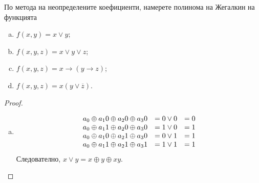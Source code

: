 \begin{problem}
  По метода на неопределените коефициенти, намерете полинома на Жегалкин на функцията 
  \begin{enumerate}[a)]
  \item
    $f(x,y) = x\vee y$;
  \item
    $f(x,y,z) = x\vee y \vee z$;
  \item
    $f(x,y,z) = x\rightarrow (y \rightarrow z)$;
  \item
    $f(x,y,z) = x(y\vee\overline{z})$.
  \end{enumerate}
\end{problem}
\begin{proof}
  \begin{enumerate}[a)]
  \item
    \[
    \begin{array}{c c c}
      a_0\oplus a_1 0 \oplus a_2 0 \oplus a_3 0 & = 0 \vee 0  &  = 0\\
      a_0\oplus a_1 1 \oplus a_2 0 \oplus a_3 0 & = 1 \vee 0  &  = 1\\
      a_0\oplus a_1 0 \oplus a_2 1 \oplus a_3 0 & = 0 \vee 1  &  = 1\\
      a_0\oplus a_1 1 \oplus a_2 1 \oplus a_3 1 & = 1 \vee 1  &  = 1\\
    \end{array}
    \]
    Следователно, $x\vee y = x\oplus y\oplus xy$.
  \end{enumerate}
\end{proof}

